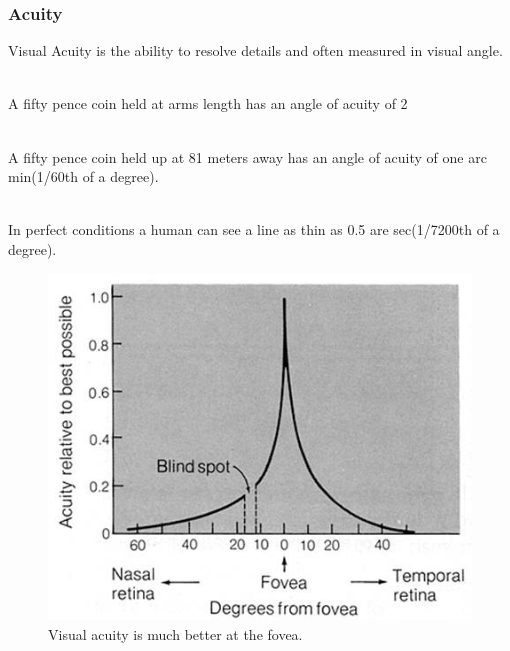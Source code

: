 \begin{frame}
	\frametitle{Acuity}
	Visual Acuity is the ability to resolve details and often measured in visual angle. \\~\\ \pause
	
	A fifty pence coin held at arms length has an angle of acuity of 2\degree \\~\\ \pause
	
	A fifty pence coin held up at 81 meters away has an angle of acuity of one arc min(1/60th of a degree). \\~\\ \pause
	
	In perfect conditions a human can see a line as thin as 0.5 are sec(1/7200th of a degree). 
\end{frame}

\begin{frame}
	\begin{figure}
		\includegraphics[scale=.9]{assets/acuity} 
		\caption{Visual acuity is much better at the fovea.}
	\end{figure}
\end{frame}

